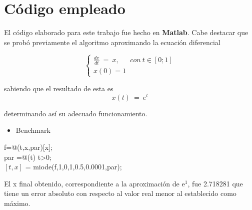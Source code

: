 \documentclass[a4paper]{article}
\begin{document}
\section{Código empleado}
El código elaborado para este trabajo fue hecho en \textbf{Matlab}.
Cabe destacar que se probó previamente el algoritmo aproximando la ecuación diferencial

\[\left\{
  \begin{array}{lr}
    \frac{dx}{dt} \ = \ x, \ \ \ \ \ \ \ con \ t \in [0;1]\\
    x(0) = 1
  \end{array}
\right.
\]

sabiendo que el resultado de esta es
\[ x(t) \ = \ e^t \]

determinando así su adecuado funcionamiento.

\begin{itemize}
	\item Benchmark
	\
\end{itemize}
	\begin{tabbing}
	 f=@(t,x,par)[x];\\
	 par =@(t) t>0; \\
	$[t,x]$ = miode(f,1,0,1,0.5,0.0001,par);\\
	\end{tabbing}
	
	El x final obtenido, correspondiente a la aproximación de e$^1$, fue 2.718281 que tiene un error absoluto con respecto al valor real menor al establecido como máximo.
	
\end{document}
